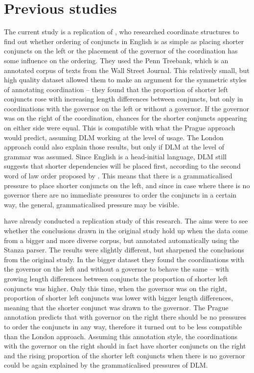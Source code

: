 \section{Previous studies}\label{sec:previous}
The current study is a replication of \cite{prz:woz:23}, who researched coordinate structures to find out whether ordering of conjuncts in English is as simple as placing shorter conjuncts on the left or the placement of the governor of the coordination has some influence on the ordering. They used the Penn Treebank, which is an annotated corpus of texts from the Wall Street Journal. This relatively small, but high quality dataset allowed them to make an argument for the symmetric styles of annotating coordination -- they found that the proportion of shorter left conjuncts rose with increasing length differences between conjuncts, but only in coordinations with the governor on the left or without a governor. If the governor was on the right of the coordination, chances for the shorter conjuncts appearing on either side were equal. This is compatible with what the Prague approach would predict, assuming DLM working at the level of usage. The London approach could also explain those results, but only if DLM at the level of grammar was assumed. Since English is a head-initial language, DLM still suggests that shorter dependencies will be placed first, according to the second word of law order proposed by \cite{behaghel}. This means that there is a grammaticalised pressure to place shorter conjuncts on the left, and since in case where there is no governor there are no immediate pressures to order the conjuncts in a certain way, the general, grammaticalised pressure may be visible. 

\cite{pbg2023} have already conducted a replication study of this research. The aims were to see whether the conclusions drawn in the original study hold up when the data come from a bigger and more diverse corpus, but annotated automatically using the Stanza parser. The results were slightly different, but sharpened the conclusions from the original study. In the bigger dataset they found the coordinations with the governor on the left and without a governor to behave the same -- with growing length differences between conjuncts the proportion of shorter left conjuncts was higher. Only this time, when the governor was on the right, proportion of shorter left conjuncts was lower with bigger length differences, meaning that the shorter conjunct was drawn to the governor. The Prague annotation predicts that with governor on the right there should be no pressures to order the conjuncts in any way, therefore it turned out to be less compatible than the London approach. Assuming this annotation style, the coordinations with the governor on the right should in fact have shorter conjuncts on the right and the rising proportion of the shorter left conjuncts when there is no governor could be again explained by the grammaticalised pressures of DLM. 

